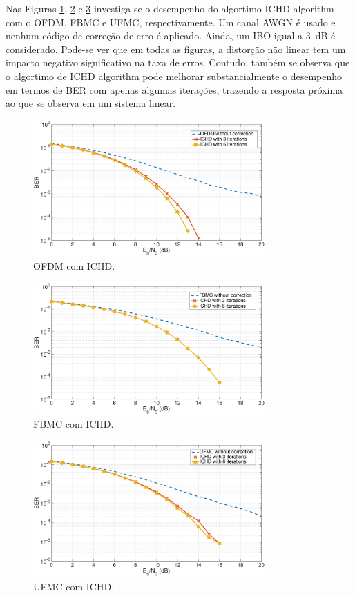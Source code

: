 Nas Figuras \ref{fig:ofdm_ichd}, \ref{fig:fbmc_ichd} e \ref{fig:ufmc_ichd} investiga-se o desempenho do algortimo ICHD algorithm com o OFDM, FBMC e UFMC, respectivamente. Um canal AWGN é usado e nenhum código de correção de erro é aplicado. Ainda, um IBO igual a 3~dB é considerado. Pode-se ver que em todas as figuras, a distorção não linear tem um impacto negativo significativo na taxa de erros. Contudo, também se observa que o algortimo de ICHD algorithm pode melhorar substancialmente o desempenho em termos de BER com apenas algumas iterações, trazendo a resposta próxima ao que se observa em um sistema linear.

\begin{figure}[h!]
\centering
\includegraphics[width=3.5in]{OFDM_ICHD} 
\caption{OFDM com ICHD.}
\label{fig:ofdm_ichd}
\end{figure}


\begin{figure}[h!]
\centering
\includegraphics[width=3.5in]{FBMC_ICHD} 
\caption{FBMC com ICHD.}
\label{fig:fbmc_ichd}
\end{figure}


\onehalfspacing
\begin{figure} [h!]
\centering
\includegraphics[width=3.5in]{UFMC_ICHD} 
\caption{UFMC com ICHD.}
\label{fig:ufmc_ichd}
\end{figure}

